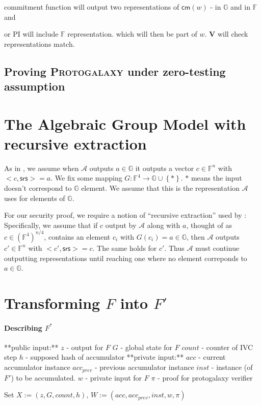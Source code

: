 \documentclass[11pt]{article} %
\newcommand{\protogal}{{\scshape Proto\bfseries{galaxy}}\xspace}
\newcommand{\V}{\ensuremath{\mathbf{V} }\xspace}
\newcommand{\G}{\ensuremath{{\mathbb G}}\xspace}
\newcommand{\F}{\ensuremath{\mathbb F}\xspace}
\newcommand{\adv}{\ensuremath{\mathcal A}\xspace}
\newcommand{\srs}{\ensuremath{\mathsf{srs}}\xspace}
\newcommand{\cm}{\ensuremath{\mathsf{cm}}\xspace}
\newcommand{\set}[1]{\ensuremath{\left\{#1\right\}}\xspace}
\newcommand{\A}{\ensuremath{\mathcal{A}}\xspace}
\begin{document}
commitment function will output two representations of $\cm(w)$ - in \G and in \F and 

or PI will include \F representation. which will then be part of $w$. \V will check representations match.
\subsection{Proving \protogal under zero-testing assumption}
\section{The Algebraic Group Model with recursive extraction}
As in \cite{agm}, we assume when \adv outputs $a\in \G$ it outputs a vector $c\in \F^n$ 
with $<c,\srs>=a$. We fix some mapping $G:\F^4\to \G\cup \set{*}$. $*$ means the input doesn't correspond to \G element. We assume that this is the representation \adv uses for elements of \G.

For our security proof, we require a notion of ``recursive extraction'' used by \cite{novarecursive}:
Specifically, we assume that if $c$ output by \A along with $a$, thought of as $c\in(\F^4)^{n/4}$, contains an element $c_i$ with $G(c_i)=a\in \G$, then \A outputs 
$c'\in \F^n$ with $<c',\srs>=c$. The same holds for $c'$. Thus \A must continue outputting representations
until reaching one where no element correponds to $a\in \G$.


\section{Transforming $F$ into $F'$}
\paragraph{Describing $F^*$}
**public input:**
$z$ - output for $F$
$G$ - global state for $F$
$count$ - counter of IVC step
$h$ - supposed hash of accumulator
**private input:**
$acc$ - current accumulator instance
$acc_{prev}$ - previous accumulator instance
$inst$ - instance (of $F'$) to be accumulated.
$w$ - private input for $F$
$\pi$ - proof for protogalaxy verifier

Set $X:=(z,G,count,h)$, $W:=(acc,acc_{prev}, inst, w, \pi)$
\end{document}
